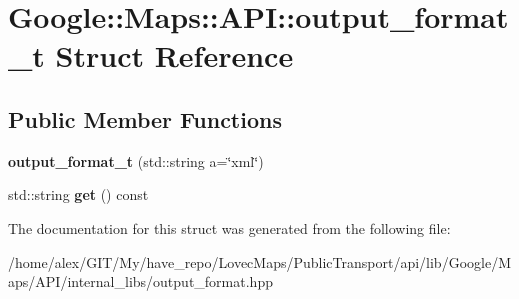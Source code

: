 \hypertarget{structGoogle_1_1Maps_1_1API_1_1output__format__t}{}\section{Google\+:\+:Maps\+:\+:A\+PI\+:\+:output\+\_\+format\+\_\+t Struct Reference}
\label{structGoogle_1_1Maps_1_1API_1_1output__format__t}
\subsection*{Public Member Functions}
\begin{DoxyCompactItemize}
\item 
\mbox{\label{structGoogle_1_1Maps_1_1API_1_1output__format__t_aee4b4f5757c465e4fdb7398a286daa57}} 
{\bfseries output\+\_\+format\+\_\+t} (std\+::string a=\char`\"{}xml\char`\"{})
\item 
\mbox{\label{structGoogle_1_1Maps_1_1API_1_1output__format__t_a1cb355bdc5f1900bfd3ed472878eab4e}} 
std\+::string {\bfseries get} () const
\end{DoxyCompactItemize}


The documentation for this struct was generated from the following file\+:\begin{DoxyCompactItemize}
\item 
/home/alex/\+G\+I\+T/\+My/have\+\_\+repo/\+Lovec\+Maps/\+Public\+Transport/api/lib/\+Google/\+Maps/\+A\+P\+I/internal\+\_\+libs/output\+\_\+format.\+hpp\end{DoxyCompactItemize}
